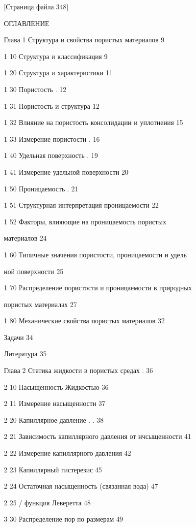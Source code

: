 \documentclass[
  11pt,
]{article}
\begin{document}
\begingroup\small\setlength{\parindent}{0pt}\setlength{\parskip}{1pt}
{[}Страница файла 348{]}\par
ОГЛАВЛЕНИЕ \par
Глава 1 Структура и свойства пористых материалов 9 \par
1 10 Структура и классификация 9 \par
1 20 Структура и характеристики 11 \par
1 30 Пористость . 12 \par
1 31 Пористость и структура 12 \par
1 32 Влияние на пористость консолидации и уплотнения 15 \par
1 33 Измерение пористости . 16 \par
1 40 Удельная поверхность . 19 \par
1 41 Измерение удельной поверхности 20 \par
1 50 Проницаемость . 21 \par
1 51 Структурная интерпретация проницаемости 22 \par
1 52 Факторы, влияющие на проницаемость пористых \par
материалов 24 \par
1 60 Типичные значения пористости, проницаемости и удель \par
ной поверхности 25 \par
1 70 Распределение пористости и проницаемости в природных \par
пористых материалах 27 \par
1 80 Механические свойства пористых материалов 32 \par
Задачи 34 \par
Литература 35 \par
Глава 2 Статика жидкости в пористых средах . 36 \par
2 10 Насыщенность Жидкостью 36 \par
2 11 Измерение насыщенности 37 \par
2 20 Капиллярное давление . . 38 \par
2 21 Зависимость капиллярного давления от нчсыщенности 41 \par
2 22 Измерение капиллярного давления 42 \par
2 23 Капиллярный гистерезис 45 \par
2 24 Остаточная насыщенность (связанная вода) 47 \par
2 25 / функция Леверетта 48 \par
3 30 Распределение пор по размерам 49 \par
\end{document}
